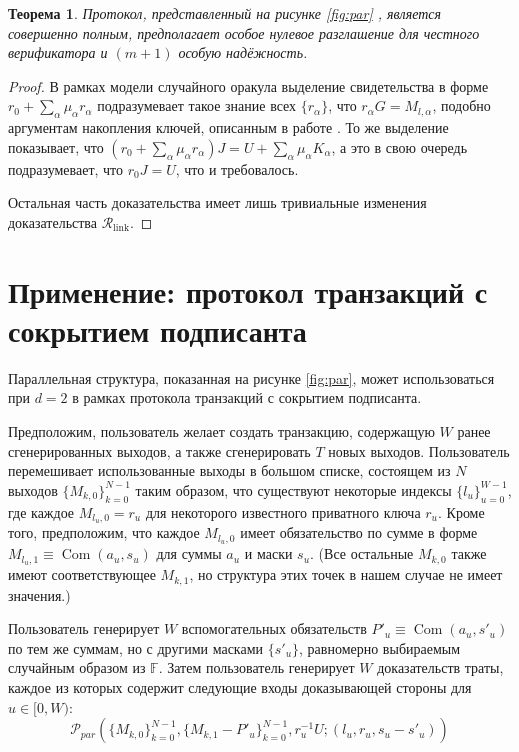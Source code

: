 \documentclass{article}
\newcommand{\F}{\mathbb{F}}
\newcommand{\com}{\operatorname{Com}}
\newtheorem{theorem}{Теорема}
\theoremstyle{definition}
\begin{document}
\begin{theorem}
Протокол, представленный на рисунке \ref{fig:par} , является совершенно полным, предполагает особое нулевое разглашение для честного верификатора и $(m+1)$ особую надёжность.
\end{theorem}

\begin{proof}
В рамках модели случайного оракула выделение свидетельства в форме $r_0 + \sum_{\alpha} \mu_\alpha r_\alpha$ подразумевает такое знание всех $\{r_\alpha\}$, что $r_\alpha G = M_{l,\alpha}$, подобно аргументам накопления ключей, описанным в работе \cite{musig}.
То же выделение показывает, что $\left(r_0 + \sum_{\alpha} \mu_\alpha r_\alpha\right)J = U + \sum_{\alpha} \mu_\alpha K_\alpha$, а это в свою очередь подразумевает, что $r_0J = U$, что и требовалось.

Остальная часть доказательства имеет лишь тривиальные изменения доказательства $\mathcal{R}_{\text{link}}$.
\end{proof}


\section{Применение: протокол транзакций с сокрытием подписанта}
Параллельная структура, показанная на рисунке \ref{fig:par}, может использоваться при $d = 2$ в рамках протокола транзакций с сокрытием подписанта.

Предположим, пользователь желает создать транзакцию, содержащую $W$ ранее сгенерированных выходов, а также сгенерировать $T$ новых выходов.
Пользователь перемешивает использованные выходы в большом списке, состоящем из $N$ выходов $\{M_{k,0}\}_{k=0}^{N-1}$ таким образом, что существуют некоторые индексы $\{l_u\}_{u=0}^{W-1}$, где каждое $M_{l_u,0} = r_u$ для некоторого известного приватного ключа $r_u$.
Кроме того, предположим, что каждое $M_{l_u,0}$ имеет обязательство по сумме в форме $M_{l_u,1} \equiv \com(a_u,s_u)$ для суммы $a_u$ и маски $s_u$.
(Все остальные $M_{k,0}$ также имеют соответствующее $M_{k,1}$, но структура этих точек в нашем случае не имеет значения.)

Пользователь генерирует $W$ вспомогательных обязательств $P'_u \equiv \com(a_u,s'_u)$ по тем же суммам, но с другими масками $\{s'_u\}$, равномерно выбираемым случайным образом из $\F$.
Затем пользователь генерирует $W$ доказательств траты, каждое из которых содержит следующие входы доказывающей стороны для $u \in [0,W)$:
$$\mathcal{P}_{par}(\{M_{k,0}\}_{k=0}^{N-1},\{M_{k,1}-P'_u\}_{k=0}^{N-1},r_u^{-1}U;(l_u,r_u,s_u-s'_u))$$
\end{document}
